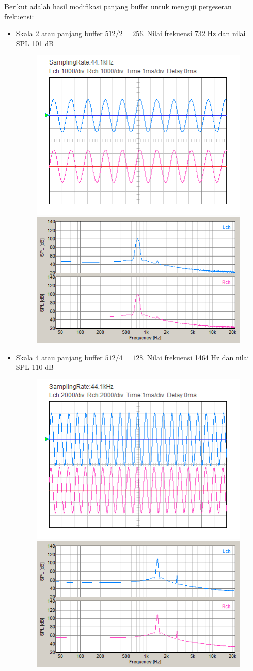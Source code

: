 \documentclass[12pt,]{article}
\begin{document}
  	\newpage
  	Berikut adalah hasil modifikasi panjang buffer untuk menguji pergeseran frekuensi:
  	\begin{itemize}
  		\item Skala 2 atau panjang buffer $512/2 = 256$.
  		Nilai frekuensi 732 Hz dan nilai SPL 101 dB
  		\begin{figure}[H]
  			\centering
  			\includegraphics[width=0.45\linewidth]{result/day_4/osi_sine2}
  			\includegraphics[width=0.45\linewidth]{result/day_4/fft_sine2}
  		\end{figure}

  		\item Skala 4 atau panjang buffer $512/4 = 128$.
  		Nilai frekuensi 1464 Hz dan nilai SPL 110 dB
  		\begin{figure}[H]
  			\centering
  			\includegraphics[width=0.45\linewidth]{result/day_4/osi_sine4}
  			\includegraphics[width=0.45\linewidth]{result/day_4/fft_sine4}
  		\end{figure}


\end{itemize}
\end{document}
